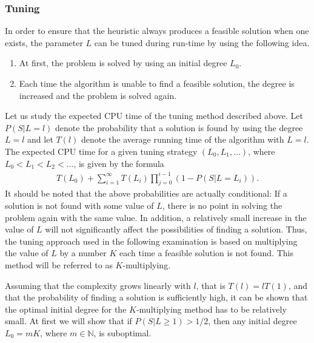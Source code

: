 \documentclass[dissertation,draft*]{aaltoseries}
\begin{document}
\subsubsection{Tuning}%
\label{doubling}
In order to ensure that the heuristic always produces a feasible solution when one exists,
the parameter $L$ can be tuned during run-time by using the following idea. 
\begin{enumerate}
\item
At first, the problem is solved by using an initial degree $L_0$. 
\item
Each time the algorithm is unable to find a feasible solution, the degree is increased and 
the problem is solved again.
\end{enumerate}
Let us study the expected CPU time of the tuning method described above.
Let $P(S|L=l)$ denote the probability that a solution is found by using the degree $L=l$
and let $T(l)$ denote the average running time of the algorithm with $L=l$. 
The expected CPU time for a given tuning strategy $(L_0,L_1,\ldots)$, where $L_0 < L_1 < L_2 < \ldots$, 
is given by the formula %
\begin{align*}
T(L_0) + \sum_{i=1}^{\infty} T(L_i) \prod_{j=0}^{i-1} (1- P(S|L=L_i)). 
\end{align*}
It should be noted that the above probabilities are actually conditional: If a solution
is not found with some value of $L$, there is no point in solving the problem 
again with the same value. In addition, a relatively small increase in 
the value of $L$ will not significantly affect the possibilities
of finding a solution. Thus, the tuning approach used in the following examination
is based on multiplying the value of $L$ by a number $K$ each time a feasible
solution is not found. This method will be referred to as $K$-multiplying.

Assuming that %
the complexity grows linearly with $l$, that is $T(l) = l T(1)$, and %
that the probability of finding a solution is sufficiently high, %
it can be shown that the optimal initial degree
for the $K$-multiplying method has to be relatively small. %
At first we will show %
that if $P(S|L \geq 1)>1/2$, then %
any initial degree $L_0 = mK$, where $m \in \mathbb{N}$, is suboptimal. %
\end{document}
